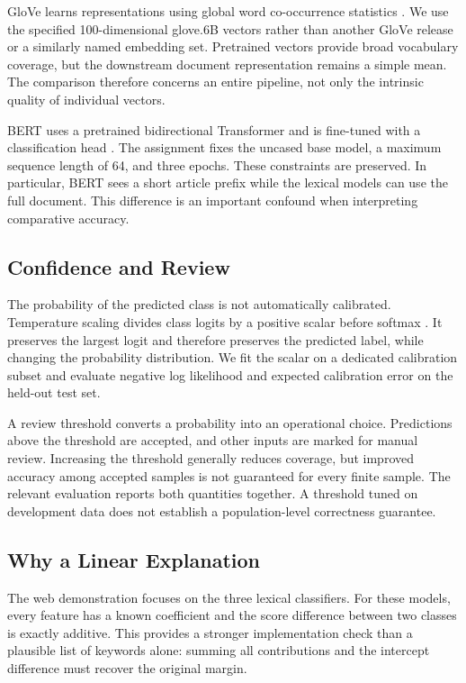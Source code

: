 \documentclass[11pt]{article}
\begin{document}
GloVe learns representations using global word co-occurrence statistics \citep{pennington2014}. We use the specified 100-dimensional glove.6B vectors rather than another GloVe release or a similarly named embedding set. Pretrained vectors provide broad vocabulary coverage, but the downstream document representation remains a simple mean. The comparison therefore concerns an entire pipeline, not only the intrinsic quality of individual vectors.

BERT uses a pretrained bidirectional Transformer and is fine-tuned with a classification head \citep{devlin2019}. The assignment fixes the uncased base model, a maximum sequence length of 64, and three epochs. These constraints are preserved. In particular, BERT sees a short article prefix while the lexical models can use the full document. This difference is an important confound when interpreting comparative accuracy.

\subsection{Confidence and Review}
The probability of the predicted class is not automatically calibrated. Temperature scaling divides class logits by a positive scalar before softmax \citep{guo2017}. It preserves the largest logit and therefore preserves the predicted label, while changing the probability distribution. We fit the scalar on a dedicated calibration subset and evaluate negative log likelihood and expected calibration error on the held-out test set.

A review threshold converts a probability into an operational choice. Predictions above the threshold are accepted, and other inputs are marked for manual review. Increasing the threshold generally reduces coverage, but improved accuracy among accepted samples is not guaranteed for every finite sample. The relevant evaluation reports both quantities together. A threshold tuned on development data does not establish a population-level correctness guarantee.

\subsection{Why a Linear Explanation}
The web demonstration focuses on the three lexical classifiers. For these models, every feature has a known coefficient and the score difference between two classes is exactly additive. This provides a stronger implementation check than a plausible list of keywords alone: summing all contributions and the intercept difference must recover the original margin.
\end{document}
